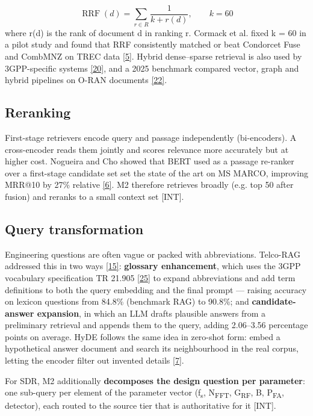 \documentclass[11pt,a4paper]{article}
\newcommand{\prov}[1]{\textsf{\footnotesize[#1]}}
\begin{document}
\begin{equation*}
\operatorname{RRF}(d) = \sum_{r \in R} \frac{1}{k + r(d)}, \qquad k = 60
\end{equation*}
where r(d) is the rank of document d in ranking r. Cormack et al. fixed k = 60 in a pilot study and found that RRF consistently matched or beat Condorcet Fuse and CombMNZ on TREC data \hyperlink{ref5}{[5]}. Hybrid dense--sparse retrieval is also used by 3GPP-specific systems \hyperlink{ref20}{[20]}, and a 2025 benchmark compared vector, graph and hybrid pipelines on O-RAN documents \hyperlink{ref22}{[22]}.

\subsection{Reranking}
First-stage retrievers encode query and passage independently (bi-encoders). A cross-encoder reads them jointly and scores relevance more accurately but at higher cost. Nogueira and Cho showed that BERT used as a passage re-ranker over a first-stage candidate set set the state of the art on MS MARCO, improving MRR@10 by 27\% relative \hyperlink{ref6}{[6]}. M2 therefore retrieves broadly (e.g. top 50 after fusion) and reranks to a small context set \prov{INT}.

\subsection{Query transformation}
Engineering questions are often vague or packed with abbreviations. Telco-RAG addressed this in two ways \hyperlink{ref15}{[15]}: \textbf{glossary enhancement}, which uses the 3GPP vocabulary specification TR 21.905 \hyperlink{ref25}{[25]} to expand abbreviations and add term definitions to both the query embedding and the final prompt --- raising accuracy on lexicon questions from 84.8\% (benchmark RAG) to 90.8\%; and \textbf{candidate-answer expansion}, in which an LLM drafts plausible answers from a preliminary retrieval and appends them to the query, adding 2.06--3.56 percentage points on average. HyDE follows the same idea in zero-shot form: embed a hypothetical answer document and search its neighbourhood in the real corpus, letting the encoder filter out invented details \hyperlink{ref7}{[7]}.

For SDR, M2 additionally \textbf{decomposes the design question per parameter}: one sub-query per element of the parameter vector (f\textsubscript{s}, N\textsubscript{FFT}, G\textsubscript{RF}, B, P\textsubscript{FA}, detector), each routed to the source tier that is authoritative for it \prov{INT}.
\end{document}
